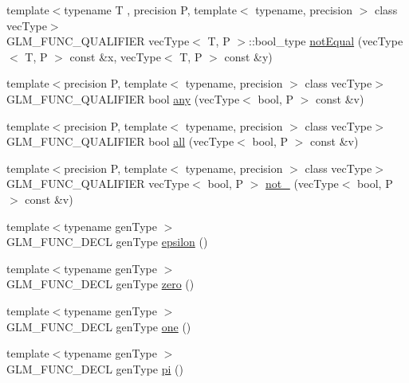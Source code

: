 \begin{DoxyCompactItemize}
\item 
{\footnotesize template$<$typename T , precision P, template$<$ typename, precision $>$ class vec\+Type$>$ }\\G\+L\+M\+\_\+\+F\+U\+N\+C\+\_\+\+Q\+U\+A\+L\+I\+F\+I\+ER vec\+Type$<$ T, P $>$\+::bool\+\_\+type \hyperlink{group__core__func__vector__relational_ga85d7bc5613c4dcc2d5873ec9d6ed4c19}{not\+Equal} (vec\+Type$<$ T, P $>$ const \&x, vec\+Type$<$ T, P $>$ const \&y)
\item 
{\footnotesize template$<$precision P, template$<$ typename, precision $>$ class vec\+Type$>$ }\\G\+L\+M\+\_\+\+F\+U\+N\+C\+\_\+\+Q\+U\+A\+L\+I\+F\+I\+ER bool \hyperlink{group__core__func__vector__relational_ga632a2644532d9332011c8860400d30b2}{any} (vec\+Type$<$ bool, P $>$ const \&v)
\item 
{\footnotesize template$<$precision P, template$<$ typename, precision $>$ class vec\+Type$>$ }\\G\+L\+M\+\_\+\+F\+U\+N\+C\+\_\+\+Q\+U\+A\+L\+I\+F\+I\+ER bool \hyperlink{group__core__func__vector__relational_ga14bbc94f2ae2774a1d64d91f8767773e}{all} (vec\+Type$<$ bool, P $>$ const \&v)
\item 
{\footnotesize template$<$precision P, template$<$ typename, precision $>$ class vec\+Type$>$ }\\G\+L\+M\+\_\+\+F\+U\+N\+C\+\_\+\+Q\+U\+A\+L\+I\+F\+I\+ER vec\+Type$<$ bool, P $>$ \hyperlink{group__core__func__vector__relational_ga4329ecbc2ef012c9ec704bd09da1f177}{not\+\_\+} (vec\+Type$<$ bool, P $>$ const \&v)
\item 
{\footnotesize template$<$typename gen\+Type $>$ }\\G\+L\+M\+\_\+\+F\+U\+N\+C\+\_\+\+D\+E\+CL gen\+Type \hyperlink{group__gtc__constants_gacb41049b8d22c8aa90e362b96c524feb}{epsilon} ()
\item 
{\footnotesize template$<$typename gen\+Type $>$ }\\G\+L\+M\+\_\+\+F\+U\+N\+C\+\_\+\+D\+E\+CL gen\+Type \hyperlink{group__gtc__constants_ga5cc97dd01d37fc199264ff6030578435}{zero} ()
\item 
{\footnotesize template$<$typename gen\+Type $>$ }\\G\+L\+M\+\_\+\+F\+U\+N\+C\+\_\+\+D\+E\+CL gen\+Type \hyperlink{group__gtc__constants_ga8186ec2c330457d41d9686c47cd3b2d1}{one} ()
\item 
{\footnotesize template$<$typename gen\+Type $>$ }\\G\+L\+M\+\_\+\+F\+U\+N\+C\+\_\+\+D\+E\+CL gen\+Type \hyperlink{group__gtc__constants_gae671930537266a9a650ccb4b88757692}{pi} ()

\end{DoxyCompactItemize}
